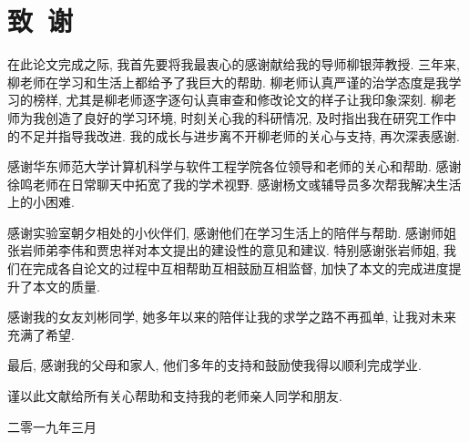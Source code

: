\chapter*{致\ 谢}
{\kaishu

在此论文完成之际, 我首先要将我最衷心的感谢献给我的导师柳银萍教授. 三年来, 柳老师在学习和生活上都给予了我巨大的帮助. 柳老师认真严谨的治学态度是我学习的榜样, 尤其是柳老师逐字逐句认真审查和修改论文的样子让我印象深刻. 柳老师为我创造了良好的学习环境, 时刻关心我的科研情况, 及时指出我在研究工作中的不足并指导我改进. 我的成长与进步离不开柳老师的关心与支持, 再次深表感谢. 

感谢华东师范大学计算机科学与软件工程学院各位领导和老师的关心和帮助. 感谢徐鸣老师在日常聊天中拓宽了我的学术视野. 感谢杨文彧辅导员多次帮我解决生活上的小困难. 

感谢实验室朝夕相处的小伙伴们, 感谢他们在学习生活上的陪伴与帮助. 感谢师姐张岩\D 师弟李伟和贾忠祥对本文提出的建设性的意见和建议. 特别感谢张岩师姐, 我们在完成各自论文的过程中互相帮助\D 互相鼓励\D 互相监督, 加快了本文的完成进度\D 提升了本文的质量. 

感谢我的女友刘彬同学, 她多年以来的陪伴让我的求学之路不再孤单, 让我对未来充满了希望. 

最后, 感谢我的父母和家人, 他们多年的支持和鼓励使我得以顺利完成学业.

谨以此文献给所有关心\D 帮助和支持我的老师\D 亲人\D 同学和朋友.

\hfill{}

\hfill 二零一九年三月

}

